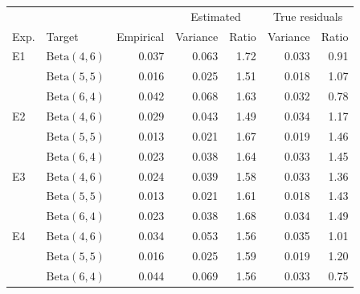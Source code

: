 \begin{tabular}{llrrrrr}
\hline
 & & & \multicolumn{2}{c}{Estimated} & \multicolumn{2}{c}{True residuals} \\
Exp. & Target & Empirical & Variance & Ratio & Variance & Ratio \\
\hline
E1 & $\mathrm{Beta}(4,6)$ & 0.037 & 0.063 & 1.72 & 0.033 & 0.91 \\
 & $\mathrm{Beta}(5,5)$ & 0.016 & 0.025 & 1.51 & 0.018 & 1.07 \\
 & $\mathrm{Beta}(6,4)$ & 0.042 & 0.068 & 1.63 & 0.032 & 0.78 \\[3pt]
E2 & $\mathrm{Beta}(4,6)$ & 0.029 & 0.043 & 1.49 & 0.034 & 1.17 \\
 & $\mathrm{Beta}(5,5)$ & 0.013 & 0.021 & 1.67 & 0.019 & 1.46 \\
 & $\mathrm{Beta}(6,4)$ & 0.023 & 0.038 & 1.64 & 0.033 & 1.45 \\[3pt]
E3 & $\mathrm{Beta}(4,6)$ & 0.024 & 0.039 & 1.58 & 0.033 & 1.36 \\
 & $\mathrm{Beta}(5,5)$ & 0.013 & 0.021 & 1.61 & 0.018 & 1.43 \\
 & $\mathrm{Beta}(6,4)$ & 0.023 & 0.038 & 1.68 & 0.034 & 1.49 \\[3pt]
E4 & $\mathrm{Beta}(4,6)$ & 0.034 & 0.053 & 1.56 & 0.035 & 1.01 \\
 & $\mathrm{Beta}(5,5)$ & 0.016 & 0.025 & 1.59 & 0.019 & 1.20 \\
 & $\mathrm{Beta}(6,4)$ & 0.044 & 0.069 & 1.56 & 0.033 & 0.75 \\
\hline
\end{tabular}
